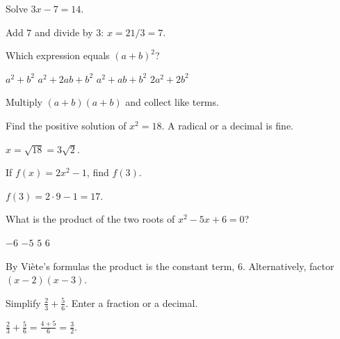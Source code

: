 \begin{problem}[points=2]
Solve $3x-7=14$.
\begin{solution}Add $7$ and divide by $3$: $x=21/3=7$.\end{solution}
\end{problem}
\begin{problem}[points=2]
Which expression equals $(a+b)^2$?
\begin{choices}
\choice $a^2+b^2$
\correctchoice $a^2+2ab+b^2$
\choice $a^2+ab+b^2$
\choice $2a^2+2b^2$
\end{choices}
\begin{solution}Multiply $(a+b)(a+b)$ and collect like terms.\end{solution}
\end{problem}
\begin{problem}[points=3]
Find the positive solution of $x^2=18$. A radical or a decimal is fine.
\begin{solution}$x=\sqrt{18}=3\sqrt{2}$.\end{solution}
\end{problem}
\begin{problem}[points=2]
If $f(x)=2x^2-1$, find $f(3)$.
\begin{solution}$f(3)=2\cdot 9-1=17$.\end{solution}
\end{problem}
\begin{problem}[points=3]
What is the product of the two roots of $x^2-5x+6=0$?
\begin{choices}
\choice $-6$
\choice $-5$
\choice $5$
\correctchoice $6$
\end{choices}
\begin{solution}By Viète's formulas the product is the constant term, $6$. Alternatively, factor $(x-2)(x-3)$.\end{solution}
\end{problem}
\begin{problem}[points=3]
Simplify $\frac{2}{3}+\frac{5}{6}$. Enter a fraction or a decimal.
\begin{solution}$\frac{2}{3}+\frac{5}{6}=\frac{4+5}{6}=\frac{3}{2}$.\end{solution}
\end{problem}
